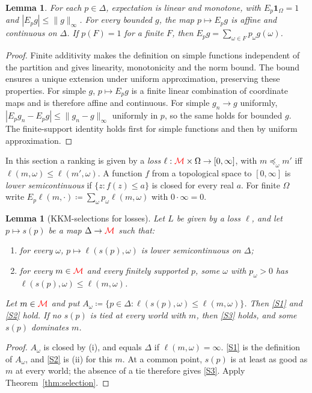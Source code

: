 \documentclass[11pt]{article}
\newcommand{\chg}[1]{{\color{red}#1}}
\newtheorem{lemma}[theorem]{Lemma}
\theoremstyle{definition}
\theoremstyle{remark}
\newcommand{\M}{\mathcal M}
\begin{document}
\begin{lemma}\label{lem:prob}
For each $p\in\Delta$, expectation is linear and monotone, with $E_p\mathbf1_\Omega=1$ and $|E_pg|\le\|g\|_\infty$. For every bounded $g$, the map $p\mapsto E_pg$ is affine and continuous on $\Delta$. If $p(F)=1$ for a finite $F$, then $E_pg=\sum_{\omega\in F}p_\omega g(\omega)$.
\end{lemma}
\begin{proof}
Finite additivity makes the definition on simple functions independent of the partition and gives linearity, monotonicity and the norm bound. The bound ensures a unique extension under uniform approximation, preserving these properties. For simple $g$, $p\mapsto E_pg$ is a finite linear combination of coordinate maps and is therefore affine and continuous. For simple $g_n\to g$ uniformly, $|E_pg_n-E_pg|\le\|g_n-g\|_\infty$ uniformly in $p$, so the same holds for bounded $g$. The finite-support identity holds first for simple functions and then by uniform approximation.
\end{proof}

In this section a ranking is given by a \emph{loss} $\ell:\chg{\M}\times\Omega\to[0,\infty]$, with $m\preceq_\omega m'$ iff $\ell(m,\omega)\le\ell(m',\omega)$. A function $f$ from a topological space to $[0,\infty]$ is \emph{lower semicontinuous} if $\{z:f(z)\le a\}$ is closed for every real $a$. For finite $\Omega$ write $E_p\ell(m,\cdot)\coloneqq\sum_\omega p_\omega\ell(m,\omega)$ with $0\cdot\infty=0$.

\begin{lemma}[KKM-selections for losses]\label{lem:loss-one-stage}
Let $L$ be given by a loss $\ell$, and let $p\mapsto s(p)$ be a map $\Delta\to\chg{\M}$ such that:
\begin{enumerate}[label=(\roman*)]
\item for every $\omega$, $p\mapsto\ell(s(p),\omega)$ is lower semicontinuous on $\Delta$;
\item for every $m\in\chg{\M}$ and every finitely supported $p$, some $\omega$ with $p_\omega>0$ has $\ell(s(p),\omega)\le\ell(m,\omega)$.
\end{enumerate}
Let $m\in\chg{\M}$ and put $A_\omega\coloneqq\{p\in\Delta:\ell(s(p),\omega)\le\ell(m,\omega)\}$. Then \ref{S1} and \ref{S2} hold. If no $s(p)$ is tied at every world with $m$, then \ref{S3} holds, and some $s(p)$ dominates $m$.
\end{lemma}
\begin{proof}
$A_\omega$ is closed by (i), and equals $\Delta$ if $\ell(m,\omega)=\infty$. \ref{S1} is the definition of $A_\omega$, and \ref{S2} is (ii) for this $m$. \chg{At a common point, $s(p)$ is at least as good as $m$ at every world; the absence of a tie therefore gives \ref{S3}.} Apply Theorem~\ref{thm:selection}.
\end{proof}
\end{document}
